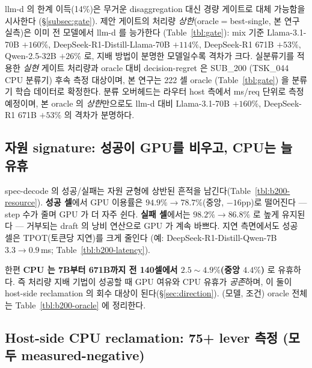 llm-d 의 한계 이득(14\%)은 무거운 disaggregation 대신 경량 게이트로 대체 가능함을 시사한다
(\S\ref{subsec:gate}).
제안 게이트의 처리량 \emph{상한}(oracle$=$best-single, 본 연구 실측)은
이미 전 모델에서 llm-d 를 능가한다 (Table~\ref{tbl:gate}):
mix 기준 Llama-3.1-70B $+160\%$, DeepSeek-R1-Distill-Llama-70B $+114\%$,
DeepSeek-R1 671B $+53\%$, Qwen-2.5-32B $+26\%$ 로,
지배 방법이 분명한 모델일수록 격차가 크다.
실분류기를 적용한 \emph{실현} 게이트 처리량과 oracle 대비 decision-regret 은
SUB\_200 (TSK\_044 CPU 분류기) 후속 측정 대상이며, 본 연구는 222 셀 oracle
(Table~\ref{tbl:gate}) 을 분류기 학습 데이터로 확정한다.
분류 오버헤드는 라우터 host 측에서 ms/req 단위로 측정 예정이며, 본 oracle 의
\emph{상한}만으로도 llm-d 대비 Llama-3.1-70B $+160\%$, DeepSeek-R1 671B $+53\%$
의 격차가 분명하다.

\subsection{자원 signature: 성공이 GPU를 비우고, CPU는 늘 유휴}
\label{subsec:res-resource}





spec-decode 의 성공/실패는 자원 균형에 상반된 흔적을 남긴다(Table~\ref{tbl:b200-resource}).
\textbf{성공 셀}에서 GPU 이용률은 $94.9\%\!\to\!78.7\%$(중앙, $-16$pp)로 떨어진다 ---
step 수가 줄며 GPU 가 더 자주 쉰다.
\textbf{실패 셀}에서는 $98.2\%\!\to\!86.8\%$ 로 높게 유지된다 ---
거부되는 draft 의 낭비 연산으로 GPU 가 계속 바쁘다.
지연 측면에서도 성공 셀은 TPOT(토큰당 지연)를 크게 줄인다
(예: DeepSeek-R1-Distill-Qwen-7B $3.3\!\to\!0.9$\,ms; Table~\ref{tbl:b200-latency}).

한편 \textbf{CPU 는 7B부터 671B까지 전 140셀에서 $2.5\!\sim\!4.9\%$(중앙 $4.4\%$)} 로 유휴하다.
즉 처리량 지배 기법이 성공할 때 GPU 여유와 CPU 유휴가 \emph{공존}하며,
이 둘이 host-side reclamation 의 회수 대상이 된다(\S\ref{sec:direction}).
(모델, 조건) oracle 전체는 Table~\ref{tbl:b200-oracle} 에 정리한다.

\subsection{Host-side CPU reclamation: 75+ lever 측정 (모두 measured-negative)}
\label{subsec:res-reclaim}



